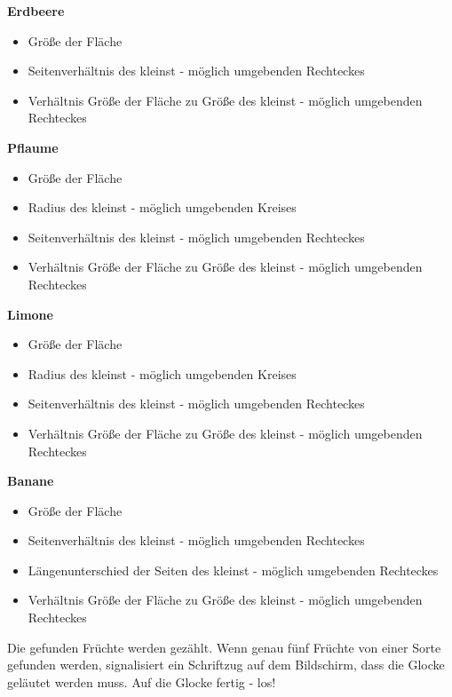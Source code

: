 \textbf{Erdbeere}

\begin{itemize}
    \item Größe der Fläche
    \item Seitenverhältnis des kleinst - möglich umgebenden Rechteckes
    \item Verhältnis Größe der Fläche zu Größe des kleinst - möglich umgebenden Rechteckes
\end{itemize}

\textbf{Pflaume}

\begin{itemize}
    \item Größe der Fläche
    \item Radius des kleinst - möglich umgebenden Kreises
    \item Seitenverhältnis des kleinst - möglich umgebenden Rechteckes
     \item Verhältnis Größe der Fläche zu Größe des kleinst - möglich umgebenden Rechteckes
\end{itemize}

\textbf{Limone}

\begin{itemize}
    \item Größe der Fläche
    \item Radius des kleinst - möglich umgebenden Kreises
    \item Seitenverhältnis des kleinst - möglich umgebenden Rechteckes
     \item Verhältnis Größe der Fläche zu Größe des kleinst - möglich umgebenden Rechteckes
\end{itemize}

\textbf{Banane}

\begin{itemize}
    \item Größe der Fläche
    \item Seitenverhältnis des kleinst - möglich umgebenden Rechteckes
    \item Längenunterschied der Seiten des kleinst - möglich umgebenden Rechteckes
    \item Verhältnis Größe der Fläche zu Größe des kleinst - möglich umgebenden Rechteckes
\end{itemize}

Die gefunden Früchte werden gezählt. Wenn genau fünf Früchte von einer Sorte gefunden werden, signalisiert ein Schriftzug auf dem Bildschirm, dass die Glocke geläutet werden muss. Auf die Glocke fertig - los!








 


